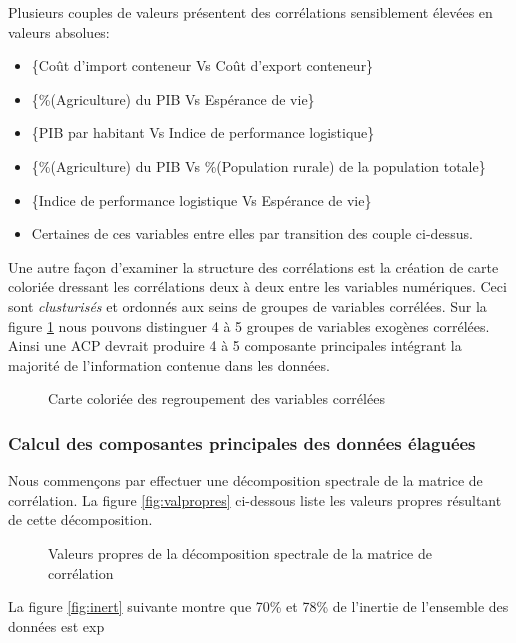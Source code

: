 	Plusieurs couples de valeurs présentent des corrélations sensiblement élevées en valeurs absolues:
	\begin{itemize}
	\item \{Coût d'import conteneur Vs Coût d'export conteneur\}
	\item \{\%(Agriculture) du PIB Vs Espérance de vie\}
	\item \{PIB par habitant Vs Indice de performance logistique\}
	\item \{\%(Agriculture) du PIB Vs \%(Population rurale) de la population totale\}
	\item \{Indice de performance logistique Vs Espérance de vie\}
	\item Certaines de ces variables entre elles par transition des couple ci-dessus.
	\end{itemize}
	Une autre façon d'examiner la structure des corrélations est la création de carte coloriée dressant les corrélations deux à deux entre les variables numériques. Ceci sont \textit{clusturisés} et ordonnés aux seins de groupes de variables corrélées. Sur la figure \ref{fig:heatmap} nous pouvons distinguer 4 à 5 groupes de variables exogènes corrélées. Ainsi une ACP devrait produire 4 à 5 composante principales intégrant la majorité de l'information contenue dans les données.
				\begin{figure}[h]
					    		\centering
					    		\caption{Carte coloriée des regroupement des variables corrélées}
					    		\label{fig:heatmap}
				\end{figure}
	\subsubsection{Calcul des composantes principales des données élaguées}
	Nous commençons par effectuer une décomposition spectrale de la matrice de corrélation. La figure \ref{fig:valpropres} ci-dessous liste les valeurs propres résultant de cette décomposition.
				\begin{figure}[h]
					    		\centering
					    		\caption{Valeurs propres de la décomposition spectrale de la matrice de corrélation}
					    		\label{valpropres}
				\end{figure}
	La figure \ref{fig:inert} suivante montre que 70\% et 78\% de l'inertie de l'ensemble des données est exp
